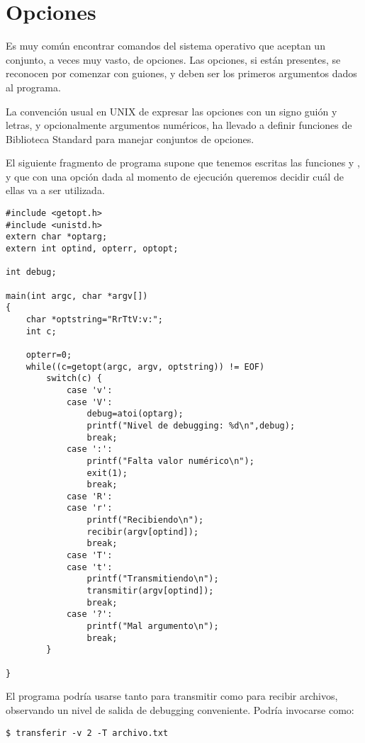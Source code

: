 \section{Opciones}
Es muy común encontrar comandos del sistema operativo que aceptan un conjunto,
a veces muy vasto, de opciones. Las opciones, si están presentes, se reconocen
por comenzar con guiones, y deben ser los primeros argumentos dados al
programa.

La convención usual en UNIX de expresar las opciones con un signo guión y
letras, y opcionalmente argumentos numéricos, ha llevado a definir funciones de
Biblioteca Standard para manejar conjuntos de opciones.

\begin{ejemplo}
El siguiente fragmento de programa supone que tenemos escritas las funciones  y , y que con una opción dada al momento de ejecución queremos decidir cuál de ellas va a ser utilizada.
\begin{lstlisting}
#include <getopt.h>
#include <unistd.h>
extern char *optarg;
extern int optind, opterr, optopt;

int debug;

main(int argc, char *argv[])
{
    char *optstring="RrTtV:v:";
    int c;

    opterr=0;
    while((c=getopt(argc, argv, optstring)) != EOF)
        switch(c) {
            case 'v':
            case 'V':
                debug=atoi(optarg);
                printf("Nivel de debugging: %d\n",debug);
                break;
            case ':':
                printf("Falta valor numérico\n");
                exit(1);
                break;
            case 'R':
            case 'r':
                printf("Recibiendo\n");
                recibir(argv[optind]);
                break;
            case 'T':
            case 't':
                printf("Transmitiendo\n");
                transmitir(argv[optind]);
                break;
            case '?':
                printf("Mal argumento\n");
                break;
        }

}	
\end{lstlisting}

El programa podría usarse tanto para transmitir como para recibir archivos,
observando un nivel de salida de debugging conveniente. Podría invocarse como:

\begin{lstlisting}
$ transferir -v 2 -T archivo.txt
\end{lstlisting}
\end{ejemplo}

